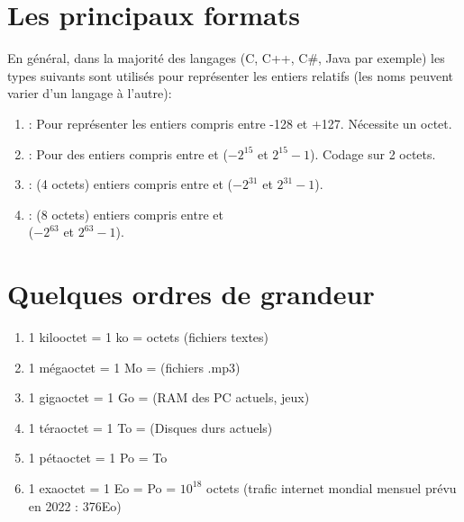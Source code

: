 \documentclass[a4paper,12pt,french]{book}
\begin{document}
\section{Les principaux formats}

En général, dans la majorité des langages (C, C++, C\#, Java par exemple)  les types suivants
sont utilisés pour représenter les entiers relatifs (les noms peuvent varier d'un langage à l'autre):
		\begin{enumerate}[\textbullet]
		\item	{} :  Pour représenter les entiers compris entre -128 et +127. Nécessite un octet.
		\item 	{} :  Pour des entiers compris entre  et  ($-2^{15}$ et $2^{15}-1$). Codage sur 2
		octets.
		\item 	{} :  (4 octets) entiers compris entre  et  ($-2^{31}$ et $2^{31}-1$).
		\item 	{} : (8 octets) entiers compris entre  et\\  ($-2^{63}$ et
		$2^{63}-1$).
		\end{enumerate}

\section{Quelques ordres de grandeur}
\begin{enumerate}[\textbullet]
	\item 	1 kilooctet = 1 ko =   octets (fichiers textes)
			\item 	1 mégaoctet = 1 Mo =  (fichiers .mp3)
			\item 	1 gigaoctet = 1 Go =  (RAM des PC actuels, jeux)
			\item 	1 téraoctet = 1 To =  (Disques durs actuels)
			\item 	1 pétaoctet = 1 Po =  To
			\item  	1 exaoctet = 1 Eo =  Po = $10^{18}$ octets (trafic internet mondial mensuel prévu en 2022 : 376Eo)
\end{enumerate}

\exostart
\end{document}
